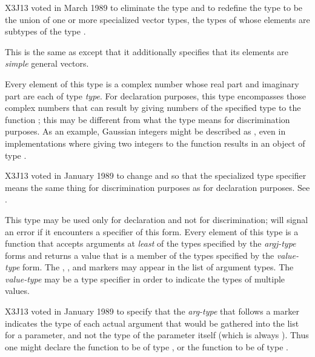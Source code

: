 \begin{flushdesc}
\begin{newer}
X3J13 voted in March 1989 
to eliminate the type  and to redefine the type
 to be the union of one or more specialized vector
types, the types of whose elements are subtypes of the type .
\end{newer}

\item[\cd{(simple-vector \emph{size})}]
This is the same
as  except that it additionally specifies
that its elements are \emph{simple} general vectors.

\item[\cd{(complex \emph{type})}]
Every element of this type is a
complex number whose real part
and imaginary part are each of type \emph{type}.
For declaration purposes, this type encompasses those complex numbers
that can result by giving numbers of the specified type
to the function ; this may be different
from what the type means for discrimination purposes.
As an example, Gaussian integers might be
described as , even in implementations
where giving two integers to the function  results
in an object of type .

\begin{new}
X3J13 voted in January 1989
to change  and 
so that the specialized 
type specifier means the same thing for discrimination purposes
as for declaration purposes.
See .
\end{new}


\item[\cd{(function (\emph{arg1-type} \emph{arg2-type} ...) \emph{value-type})}]
\relax This type may be used only for declaration and not for
discrimination;  will signal an error if it encounters a specifier of
this form. Every element of this type is
a function that accepts arguments at \emph{least} of the
types specified by the \emph{argj-type} forms and returns a value that is a
member of the types specified by the \emph{value-type} form.  The
, , and  markers
may appear in the list of argument types.
The \emph{value-type} may be a  type specifier
in order to indicate the types of multiple values.

\begin{new}
X3J13 voted in January 1989
to specify that the \emph{arg-type} that
follows a  marker indicates the type of each actual argument
that would be gathered into the list for a  parameter,
and not the type of the  parameter itself (which is always
).  Thus one might declare the function  to
be of type , or
the function  to be of type
.
\end{new}


\end{flushdesc}
